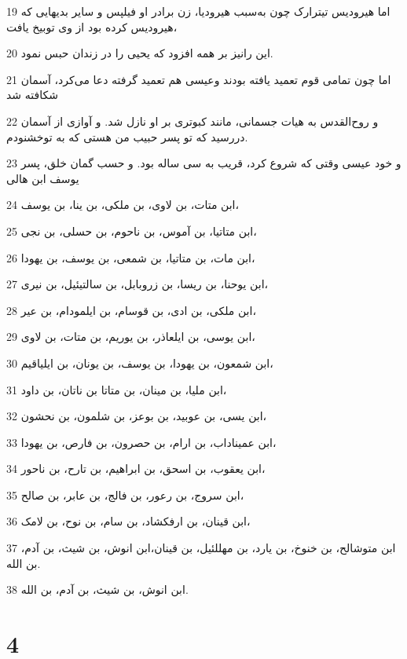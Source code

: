 \par 19 اما هیرودیس تیترارک چون به‌سبب هیرودیا، زن برادر او فیلپس و سایر بدیهایی که هیرودیس کرده بود از وی توبیخ یافت،
\par 20 این رانیز بر همه افزود که یحیی را در زندان حبس نمود.
\par 21 اما چون تمامی قوم تعمید یافته بودند وعیسی هم تعمید گرفته دعا می‌کرد، آسمان شکافته شد
\par 22 و روح‌القدس به هیات جسمانی، مانند کبوتری بر او نازل شد. و آوازی از آسمان در‌رسید که تو پسر حبیب من هستی که به توخشنودم.
\par 23 و خود عیسی وقتی که شروع کرد، قریب به سی ساله بود. و حسب گمان خلق، پسر یوسف ابن هالی
\par 24 ابن متات، بن لاوی، بن ملکی، بن ینا، بن یوسف،
\par 25 ابن متاتیا، بن آموس، بن ناحوم، بن حسلی، بن نجی،
\par 26 ابن مات، بن متاتیا، بن شمعی، بن یوسف، بن یهودا،
\par 27 ابن یوحنا، بن ریسا، بن زروبابل، بن سالتیئیل، بن نیری،
\par 28 ابن ملکی، بن ادی، بن قوسام، بن ایلمودام، بن عیر،
\par 29 ابن یوسی، بن ایلعاذر، بن یوریم، بن متات، بن لاوی،
\par 30 ابن شمعون، بن یهودا، بن یوسف، بن یونان، بن ایلیاقیم،
\par 31 ابن ملیا، بن مینان، بن متاتا بن ناتان، بن داود،
\par 32 ابن یسی، بن عوبید، بن بوعز، بن شلمون، بن نحشون،
\par 33 ابن عمیناداب، بن ارام، بن حصرون، بن فارص، بن یهودا،
\par 34 ابن یعقوب، بن اسحق، بن ابراهیم، بن تارح، بن ناحور،
\par 35 ابن سروج، بن رعور، بن فالج، بن عابر، بن صالح،
\par 36 ابن قینان، بن ارفکشاد، بن سام، بن نوح، بن لامک،
\par 37 ابن متوشالح، بن خنوخ، بن یارد، بن مهللئیل، بن قینان،ابن انوش، بن شیث، بن آدم، بن الله.
\par 38 ابن انوش، بن شیث، بن آدم، بن الله.

\chapter{4}

